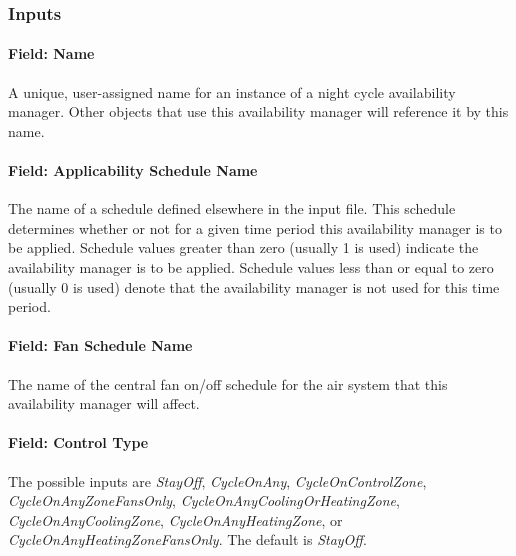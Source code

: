 \subsubsection{Inputs}\label{inputs-3-037}

\paragraph{Field: Name}\label{field-name-2-030}

A unique, user-assigned name for an instance of a night cycle availability manager. Other objects that use this availability manager will reference it by this name.

\paragraph{Field: Applicability Schedule Name}

The name of a schedule defined elsewhere in the input file. This schedule determines whether or not for a given time period this availability manager is to be applied. Schedule values greater than zero (usually 1 is used) indicate the availability manager is to be applied. Schedule values less than or equal to zero (usually 0 is used) denote that the availability manager is not used for this time period.

\paragraph{Field: Fan Schedule Name}

The name of the central fan on/off schedule for the air system that this availability manager will affect.

\paragraph{Field: Control Type}

The possible inputs are \emph{StayOff}, \emph{CycleOnAny}, \emph{CycleOnControlZone}, \emph{CycleOnAnyZoneFansOnly}, \emph{CycleOnAnyCoolingOrHeatingZone}, \emph{CycleOnAnyCoolingZone}, \emph{CycleOnAnyHeatingZone}, or \emph{CycleOnAnyHeatingZoneFansOnly}. The default is \emph{StayOff}.

